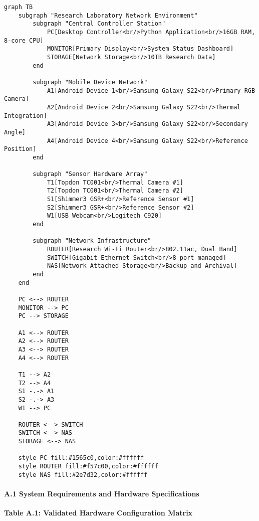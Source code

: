 \documentclass[12pt,a4paper]{article}
\begin{document}
\begin{verbatim}
graph TB
    subgraph "Research Laboratory Network Environment"
        subgraph "Central Controller Station"
            PC[Desktop Controller<br/>Python Application<br/>16GB RAM, 8-core CPU]
            MONITOR[Primary Display<br/>System Status Dashboard]
            STORAGE[Network Storage<br/>10TB Research Data]
        end
        
        subgraph "Mobile Device Network"
            A1[Android Device 1<br/>Samsung Galaxy S22<br/>Primary RGB Camera]
            A2[Android Device 2<br/>Samsung Galaxy S22<br/>Thermal Integration]
            A3[Android Device 3<br/>Samsung Galaxy S22<br/>Secondary Angle]
            A4[Android Device 4<br/>Samsung Galaxy S22<br/>Reference Position]
        end
        
        subgraph "Sensor Hardware Array"
            T1[Topdon TC001<br/>Thermal Camera #1]
            T2[Topdon TC001<br/>Thermal Camera #2]
            S1[Shimmer3 GSR+<br/>Reference Sensor #1]
            S2[Shimmer3 GSR+<br/>Reference Sensor #2]
            W1[USB Webcam<br/>Logitech C920]
        end
        
        subgraph "Network Infrastructure"
            ROUTER[Research Wi-Fi Router<br/>802.11ac, Dual Band]
            SWITCH[Gigabit Ethernet Switch<br/>8-port managed]
            NAS[Network Attached Storage<br/>Backup and Archival]
        end
    end
    
    PC <--> ROUTER
    MONITOR --> PC
    PC --> STORAGE
    
    A1 <--> ROUTER
    A2 <--> ROUTER
    A3 <--> ROUTER
    A4 <--> ROUTER
    
    T1 --> A2
    T2 --> A4
    S1 -.-> A1
    S2 -.-> A3
    W1 --> PC
    
    ROUTER <--> SWITCH
    SWITCH <--> NAS
    STORAGE <--> NAS
    
    style PC fill:#1565c0,color:#ffffff
    style ROUTER fill:#f57c00,color:#ffffff
    style NAS fill:#2e7d32,color:#ffffff
\end{verbatim}

\paragraph{A.1 System Requirements and Hardware Specifications}

\textbf{Table A.1: Validated Hardware Configuration Matrix}
\end{document}
